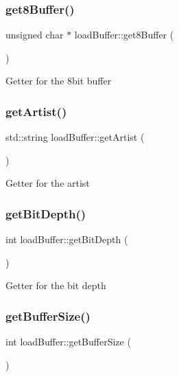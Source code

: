 \subsubsection{\texorpdfstring{get8\+Buffer()}{get8Buffer()}}
{\footnotesize\ttfamily unsigned char $\ast$ load\+Buffer\+::get8\+Buffer (\begin{DoxyParamCaption}{ }\end{DoxyParamCaption})}

Getter for the 8bit buffer \mbox{\label{classloadBuffer_a0d57faf2711fc72a2b801f31f38a415e}} 
\subsubsection{\texorpdfstring{get\+Artist()}{getArtist()}}
{\footnotesize\ttfamily std\+::string load\+Buffer\+::get\+Artist (\begin{DoxyParamCaption}{ }\end{DoxyParamCaption})}

Getter for the artist \mbox{\label{classloadBuffer_aa4d8b0a75f4459dc0f255f62d822e14b}} 
\subsubsection{\texorpdfstring{get\+Bit\+Depth()}{getBitDepth()}}
{\footnotesize\ttfamily int load\+Buffer\+::get\+Bit\+Depth (\begin{DoxyParamCaption}{ }\end{DoxyParamCaption})}

Getter for the bit depth \mbox{\label{classloadBuffer_afdb86606188438cef499304c2a0af433}} 
\subsubsection{\texorpdfstring{get\+Buffer\+Size()}{getBufferSize()}}
{\footnotesize\ttfamily int load\+Buffer\+::get\+Buffer\+Size (\begin{DoxyParamCaption}{ }\end{DoxyParamCaption})}

